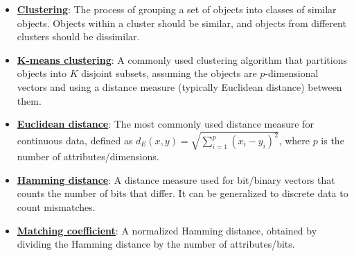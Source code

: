 \documentclass{article}%
\begin{document}
\begin{itemize}[leftmargin=*]%
\item \href{https://purdue.brightspace.com/d2l/common/assets/pdfjs-d2l-dist/1.0.14-legacy/web/viewer.html?file=\%2Fcontent\%2Fenforced\%2F1095467-wl.202510.CS.24300.001\%2F12L2-distance-clusters.pdf\%3Fou\%3D1095467\&lang=en-us\&container=d2l-fileviewer-rendered-pdf\&fullscreen=d2l-fileviewer-rendered-pdf-dialog\&height=667#page=4}{\textbf{Clustering}}: The process of grouping a set of objects into classes of similar objects. Objects within a cluster should be similar, and objects from different clusters should be dissimilar.%
\item \href{https://purdue.brightspace.com/d2l/common/assets/pdfjs-d2l-dist/1.0.14-legacy/web/viewer.html?file=\%2Fcontent\%2Fenforced\%2F1095467-wl.202510.CS.24300.001\%2F12L2-distance-clusters.pdf\%3Fou\%3D1095467\&lang=en-us\&container=d2l-fileviewer-rendered-pdf\&fullscreen=d2l-fileviewer-rendered-pdf-dialog\&height=667#page=21}{\textbf{K{-}means clustering}}: A commonly used clustering algorithm that partitions objects into $K$ disjoint subsets, assuming the objects are $p$-dimensional vectors and using a distance measure (typically Euclidean distance) between them.%
\item \href{https://purdue.brightspace.com/d2l/common/assets/pdfjs-d2l-dist/1.0.14-legacy/web/viewer.html?file=\%2Fcontent\%2Fenforced\%2F1095467-wl.202510.CS.24300.001\%2F12L2-distance-clusters.pdf\%3Fou\%3D1095467\&lang=en-us\&container=d2l-fileviewer-rendered-pdf\&fullscreen=d2l-fileviewer-rendered-pdf-dialog\&height=667#page=17}{\textbf{Euclidean distance}}: The most commonly used distance measure for continuous data, defined as $d_E(x, y) = \sqrt{\sum_{i=1}^{p} (x_i - y_i)^2}$, where $p$ is the number of attributes/dimensions.%
\item \href{https://purdue.brightspace.com/d2l/common/assets/pdfjs-d2l-dist/1.0.14-legacy/web/viewer.html?file=\%2Fcontent\%2Fenforced\%2F1095467-wl.202510.CS.24300.001\%2F12L2-distance-clusters.pdf\%3Fou\%3D1095467\&lang=en-us\&container=d2l-fileviewer-rendered-pdf\&fullscreen=d2l-fileviewer-rendered-pdf-dialog\&height=667#page=19}{\textbf{Hamming distance}}: A distance measure used for bit/binary vectors that counts the number of bits that differ. It can be generalized to discrete data to count mismatches.%
\item \href{https://purdue.brightspace.com/d2l/common/assets/pdfjs-d2l-dist/1.0.14-legacy/web/viewer.html?file=\%2Fcontent\%2Fenforced\%2F1095467-wl.202510.CS.24300.001\%2F12L2-distance-clusters.pdf\%3Fou\%3D1095467\&lang=en-us\&container=d2l-fileviewer-rendered-pdf\&fullscreen=d2l-fileviewer-rendered-pdf-dialog\&height=667#page=19}{\textbf{Matching coefficient}}: A normalized Hamming distance, obtained by dividing the Hamming distance by the number of attributes/bits.%

\end{itemize}
\end{document}

